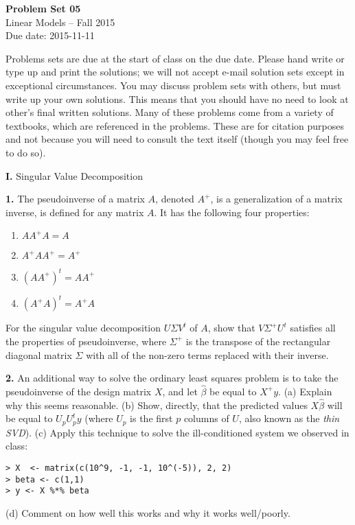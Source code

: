 \documentclass[12pt]{article}
\begin{document}
\begin{center}
{\bf Problem Set 05} \\
Linear Models -- Fall 2015 \\
Due date: 2015-11-11
\end{center}

\medskip

Problems sets are due at the start of class on the due date. Please hand write
or type up and print the solutions; we will not accept e-mail solution sets except
in exceptional circumstances. You may discuss problem sets with others, but must
write up your own solutions. This means that you should have no need to look at other's
final written solutions. Many of these problems come from a variety of textbooks,
which are referenced in the problems. These are for citation purposes and not because
you will need to consult the text itself (though you may feel free to do so).

\medskip

{\bf I.} Singular Value Decomposition

{\bf 1.} The pseudoinverse of a matrix $A$, denoted $A^{+}$, is a generalization of
a matrix inverse, is defined for any matrix $A$. It has the following four properties:
\begin{enumerate}
\item $A A^{+} A = A$
\item $A^{+} A A^{+} = A^{+}$
\item $(A A^{+})^{t} = A A^{+}$
\item $(A^{+} A)^{t} = A^{+} A$
\end{enumerate}
For the singular value decomposition $U \Sigma V^t$ of $A$, show that $V \Sigma^{+} U^t$
satisfies all the properties of pseudoinverse, where $\Sigma^{+}$ is the transpose of the
rectangular diagonal matrix $\Sigma$ with all of the non-zero terms replaced with their
inverse.

{\bf 2.} An additional way to solve the ordinary least squares problem is to take the
pseudoinverse of the design matrix $X$, and let $\widehat{\beta}$ be equal to $X^{+} y$.
(a) Explain why this seems reasonable.  (b) Show, directly, that
the predicted values $X\widehat{\beta}$ will be equal to $U_pU_p^t y$ (where $U_p$ is
the first $p$ columns of $U$, also known as the \textit{thin SVD}).
(c) Apply this technique to solve the ill-conditioned system we observed in class:
\begin{verbatim}
> X  <- matrix(c(10^9, -1, -1, 10^(-5)), 2, 2)
> beta <- c(1,1)
> y <- X %*% beta
\end{verbatim}
(d) Comment on how well this works and why it works well/poorly.
\end{document}
